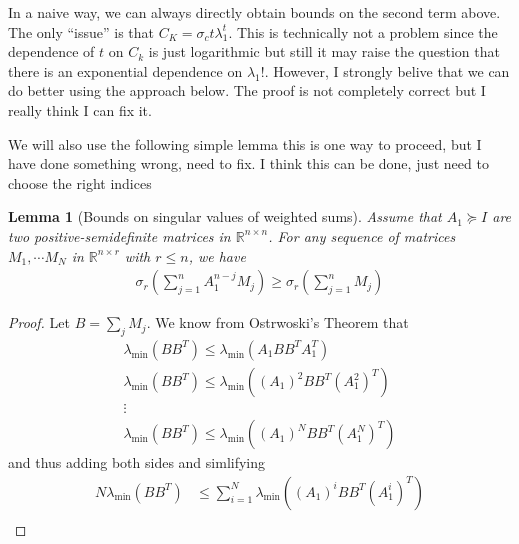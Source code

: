 \documentclass[10pt]{article}
\newcommand{\R}{\mathbb{R}}
\newtheorem{lem}[theorem]{Lemma}
\begin{document}
{\color{blue} 
In a naive way, we can always directly obtain bounds on the second term above. The only ``issue'' is that $C_K = \sigma_c t \lambda_1^t$. This is technically not a problem since the dependence of $t$ on $C_k$ is just logarithmic but still it may raise the question that there is an exponential dependence on $\lambda_1$!. However, I strongly belive that we can do better using the approach below. The proof is not completely correct but I really think I can fix it. 

}
{\color{red} We will also use the following simple lemma
 this is one way to proceed, but I have done something wrong, need to fix. I think this can be done, just need to choose the right indices
\begin{lem}[Bounds on singular values of weighted sums]
Assume that $A_1 \succeq I$ are two positive-semidefinite matrices in $\R^{n \times n}$. For any sequence of matrices $M_1, \cdots M_N$ in $\R^{n \times r}$ with $r \leq n$, we have  %
\begin{align*}
\sigma_r\left( \sum_{j=1}^n A_1^{n-j} M_{j} \right) \geq \sigma_r\left( \sum_{j=1}^n M_{j} \right)
\end{align*}
\end{lem} 
\begin{proof}
Let $B = \sum_j M_j$. We know from Ostrwoski's Theorem that
\begin{gather*}
\lambda_{\min}(B B^T ) \leq \lambda_{\min}(A_1 B B^T A_1^T) \\
\lambda_{\min}(B B^T) \leq \lambda_{\min}((A_1)^2 B B^T (A_1^2)^T) \\
\vdots \\
\lambda_{\min}(B B^T) \leq \lambda_{\min}((A_1)^N B B^T (A_1^N)^T)
\end{gather*}
and thus adding both sides and simlifying
\begin{align*}
N \lambda_{\min}(BB^T) &\leq \sum_{i=1}^N \lambda_{\min}((A_1)^i B B^T (A_1^i)^T) \\

\end{align*}
\end{proof}}
\end{document}
